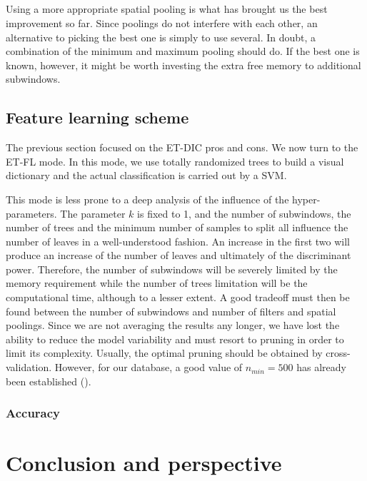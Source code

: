 \documentclass[a4paper]{report}
\begin{document}
	
	\paragraph{}
	Using a more appropriate spatial pooling is what has brought us the best improvement so far. Since poolings do not interfere with each other, an alternative to picking the best one is simply to use several. In doubt, a combination of the minimum and maximum pooling should do. If the best one is known, however, it might be worth investing the extra free memory to additional subwindows.
	

	\section{Feature learning scheme}
	The previous section focused on the ET-DIC pros and cons. We now turn to the ET-FL mode. In this mode, we use totally randomized trees to build a visual dictionary and the actual classification is carried out by a SVM. 
	\par
	This mode is less prone to a deep analysis of the influence of the hyper-parameters. The parameter $k$ is fixed to 1, and the number of subwindows, the number of trees and the minimum number of samples to split all influence the number of leaves in a well-understood fashion. An increase in the first two will produce an increase of the number of leaves and ultimately of the discriminant power. Therefore, the number of subwindows will be severely limited by the memory requirement while the number of trees limitation will be the computational time, although to a lesser extent. A good tradeoff must then be found between the number of subwindows and number of filters and spatial poolings. 
	Since we are not averaging the results any longer, we have lost the ability to reduce the model variability and must resort to pruning in order to limit its complexity. Usually, the optimal pruning should be obtained by cross-validation. However, for our database, a good value of $n_{min} = 500$ has already been established (\cite{}). 
	\subsection{Accuracy}
	
	
\chapter{Conclusion and perspective}
 


  
\end{document}
